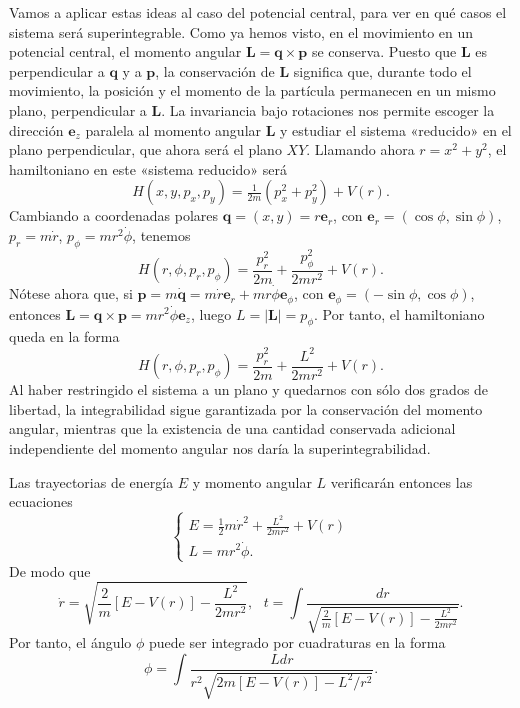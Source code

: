 \documentclass[11pt,a4paper,twoside]{article}
\theoremstyle{definition} \newtheorem{defn}[thm]{Definición}
\theoremstyle{definition} \newtheorem{ejemplo}[thm]{Ejemplo}
\theoremstyle{definition} \newtheorem{ejercicio}[thm]{Ejercicio}
\theoremstyle{remark} \newtheorem*{obs}{Observación}
\newcommand{\vect}[1]{\mathbf{#1}}
\begin{document}
  Vamos a aplicar estas ideas al caso del potencial central, para ver en qué casos el sistema será superintegrable. Como ya hemos visto, en el movimiento en un potencial central, el momento angular $\vect{L}=\vect{q}\times \vect{p}$ se conserva. Puesto que $\vect{L}$ es perpendicular a $\vect{q}$ y a $\vect{p}$, la conservación de $\vect{L}$ significa que, durante todo el movimiento, la posición y el momento de la partícula permanecen en un mismo plano, perpendicular a $\vect{L}$. La invariancia bajo rotaciones nos permite escoger la dirección $\vect{e}_z$ paralela al momento angular $\vect{L}$ y estudiar el sistema «reducido» en el plano perpendicular, que ahora será el plano $XY$. Llamando ahora $r=x^2+y^2$, el hamiltoniano en este «sistema reducido» será
  \begin{equation}
    H(x,y,p_x,p_y)= \tfrac{1}{2m}(p_x^2+p_y^2)+V(r).
  \end{equation}
  Cambiando a coordenadas polares $\vect{q}=(x,y)=r\vect{e}_{r}$, con $\vect{e}_r=(\cos \phi, \sin \phi)$, $p_r=m\dot r$, $p_{\phi}=mr^2\dot \phi$, tenemos
  \begin{equation}
    H(r,\phi,p_r,p_{\phi})=\frac{p_r^2}{2m}+\frac{p_{\phi}^2}{2mr^2}+V(r). 
  \end{equation}
  Nótese ahora que, si $\vect{p}=m\dot{\vect{q}}=m\dot r \vect{e}_r + mr \dot \phi \vect{e}_{\phi}$, con $\vect{e}_{\phi}=(-\sin \phi,\cos \phi)$, entonces $\vect{L}=\vect{q}\times \vect{p}=mr^2\dot \phi \vect{e}_z$, luego $L=|\vect{L}|=p_{\phi}$. Por tanto, el hamiltoniano queda en la forma
  \begin{equation}
    H(r,\phi,p_r,p_{\phi})=\frac{p_r^2}{2m}+\frac{L^2}{2mr^2}+V(r). 
  \end{equation}
  Al haber restringido el sistema a un plano y quedarnos con sólo dos grados de libertad, la integrabilidad sigue garantizada por la conservación del momento angular, mientras que la existencia de una cantidad conservada adicional independiente del momento angular nos daría la superintegrabilidad.

  Las trayectorias de energía $E$ y momento angular $L$ verificarán entonces las ecuaciones
  \begin{equation}
    \begin{cases}
    E=\tfrac{1}{2}m\dot r^2+\frac{L^2}{2mr^2}+V(r) \\
    L=mr^2\dot \phi.
  \end{cases}
  \end{equation}
  De modo que
  \begin{equation}
      \dot r=\sqrt{\frac{2}{m}[E-V(r)]-\frac{L^2}{2mr^2}}, \ \ \  
    t=\int \frac{dr}{\sqrt{\frac{2}{m}[E-V(r)]-\frac{L^2}{2mr^2}}}.
  \end{equation}
  Por tanto, el ángulo $\phi$ puede ser integrado por cuadraturas en la forma
  \begin{equation}
    \phi=\int\frac{Ldr}{r^2\sqrt{2m[E-V(r)]-L^2/r^2}}. 
    \label{eq:intphi}
  \end{equation}
\end{document}
